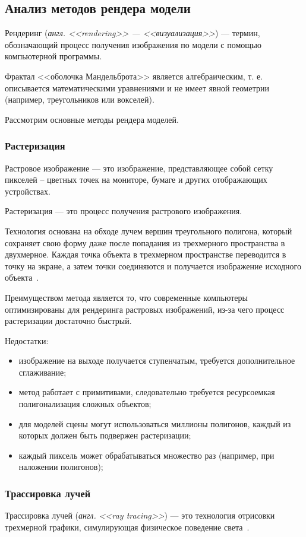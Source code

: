 \subsection{Анализ методов рендера модели}
Рендеринг (\textit{англ. <<rendering>> --- <<визуализация>>}) --- термин, обозначающий
процесс получения изображения по модели с помощью компьютерной программы.

Фрактал <<оболочка Мандельброта>> является алгебраическим, т. е. описывается математическими уравнениями
и не имеет явной геометрии (например, треугольников или вокселей).

Рассмотрим основные методы рендера моделей.

\subsubsection{Растеризация}
Растровое изображение --- это изображение, представляющее собой сетку пикселей
-- цветных точек на мониторе, бумаге и других отображающих устройствах. %

Растеризация --- это процесс получения растрового изображения.

Технология основана на обходе лучем вершин треугольного полигона, который сохраняет
свою форму даже после попадания из трехмерного пространства в двухмерное.
Каждая точка объекта в трехмерном пространстве переводится в точку на экране, а затем
точки соединяются и получается изображение исходного объекта~\cite{rendering}.

Преимуществом метода является то, что современные компьютеры
оптимизированы для рендеринга растровых изображений, из-за чего процесс растеризации достаточно быстрый.

Недостатки:
\begin{itemize}
  \item изображение на выходе получается ступенчатым, требуется дополнительное сглаживание;
  \item метод работает с примитивами, следовательно требуется ресурсоемкая полигонализация сложных объектов;
  \item для моделей сцены могут использоваться миллионы полигонов, каждый из которых должен быть подвержен растеризации;
  \item каждый пиксель может обрабатываться множество раз (например, при наложении полигонов);
\end{itemize}

\subsubsection{Трассировка лучей}
Трассировка лучей (\textit{англ. <<ray tracing>>}) --- это технология отрисовки трехмерной графики,
симулирующая физическое поведение света~\cite{rt_rendering}. %


